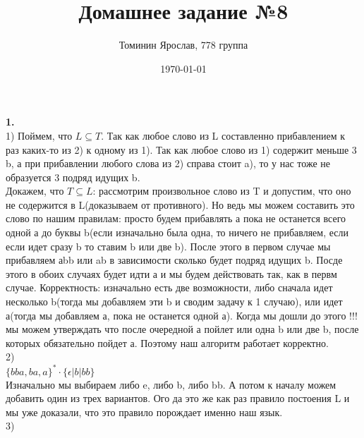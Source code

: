 \documentclass[a4paper,12pt]{article}
\author{Томинин Ярослав, 778 группа}
\title{Домашнее задание №8}
\date{\today}
\begin{document}
 

\maketitle
\newpage
\textbf{1.}\\
1) Поймем, что $L \subseteq T$. Так как любое слово из L составленно прибавлением к раз каких-то из 2) к одному из 1). Так как любое слово из 1) содержит меньше 3 b, а при прибавлении любого слова из 2) справа стоит a), то у нас тоже не образуется 3 подряд идущих b.\\
Докажем, что $T \subseteq L$: рассмотрим произвольное слово из T и допустим, что оно не содержится в L(доказываем от противного). Но ведь мы можем составить это слово по нашим правилам: просто будем прибавлять а пока не останется всего одной а до буквы b(если изначально была одна, то ничего не прибавляем, если если идет сразу b то ставим b или две b). После этого в первом случае мы прибавляем  аbb или ab в зависимости сколько будет подряд идущих b. Посде этого в обоих случаях будет идти а и мы будем действовать так, как в первм случае. Корректность: изначально есть две возможности, либо сначала идет несколько b(тогда мы добавляем эти b и сводим задачу к 1 случаю), или идет а(тогда мы добавляем а, пока не останется одной а). Когда мы дошли до этого !!!мы можем утверждать что после очередной а пойлет или одна b или две b, после которых обязательно пойдет а. Поэтому наш алгоритм работает корректно.\\
2)\\
$  \lbrace bba,ba,a\rbrace ^* \cdot \lbrace \epsilon | b|bb\rbrace$\\
Изначально мы выбираем либо e, либо b, либо bb. А потом к началу можем добавить  один из трех вариантов. Ого да это же как раз правило постоения L и мы уже доказали, что это правило порождает именно наш язык.\\
3)
\begin{center} 
\end{center}
\end{document}
